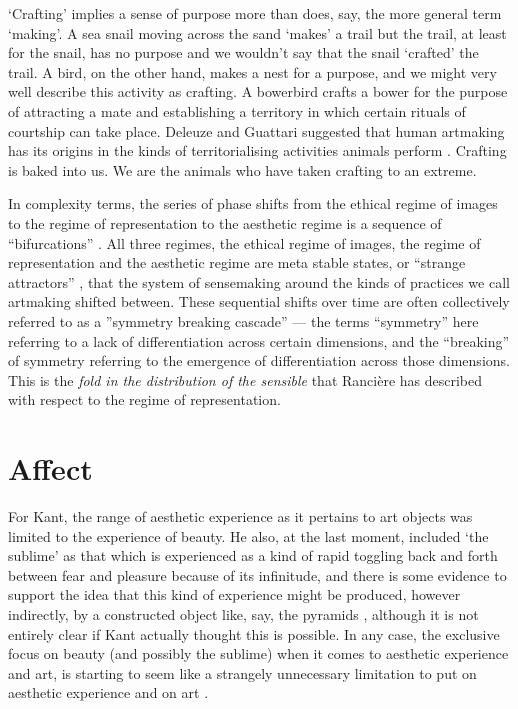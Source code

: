 \documentclass[letterpaper]{article}
\begin{document}
    ‘Crafting’ implies a sense of purpose more than does, say, the more general term ‘making’. A sea snail moving across the sand ‘makes’ a trail but the trail, at least for the snail, has no purpose and we wouldn't say that the snail ‘crafted’ the trail. A bird, on the other hand, makes a nest for a purpose, and we might very well describe this activity as crafting. A bowerbird crafts a bower for the purpose of attracting a mate and establishing a territory in which certain rituals of courtship can take place. Deleuze and Guattari suggested that human artmaking has its origins in the kinds of territorialising activities animals perform \citep[p.15]{GuattariChsmss1995}. Crafting is baked into us. We are the animals who have taken crafting to an extreme.
    
    In complexity terms, the series of phase shifts from the ethical regime of images to the regime of representation to the aesthetic regime is a sequence of “bifurcations” \citep{LandauThryOfPhstrnstns1936}. All three regimes, the ethical regime of images, the regime of representation and the aesthetic regime are meta stable states, or “strange attractors” \citep{RuelleTakensOnThNtrOfTrblnc1971}, that the system of sensemaking around the kinds of practices we call artmaking shifted between. These sequential shifts over time are often collectively referred to as a ”symmetry breaking cascade” — the terms “symmetry” here referring to a lack of differentiation across certain dimensions, and the “breaking” of symmetry referring to the emergence of differentiation across those dimensions. This is the \emph{fold in the distribution of the sensible} that Rancière has described with respect to the regime of representation.

\section{Affect}

    For Kant, the range of aesthetic experience as it pertains to art objects was limited to the experience of beauty.  He also, at the last moment, included ‘the sublime’ \citep[p.15]{ZepkeSblmArt2017} as that which is experienced as a kind of rapid toggling back and forth between fear and pleasure \citep[p.88]{KantCrtqOfJdgmnt} because of its infinitude, and there is some evidence to support the idea that this kind of experience might be produced, however indirectly, by a constructed object like, say, the pyramids \citep[p.82]{KantCrtqOfJdgmnt}, although it is not entirely clear if Kant actually thought this is possible. In any case, the exclusive focus on beauty (and possibly the sublime) when it comes to aesthetic experience and art, is starting to seem like a strangely unnecessary limitation to put on aesthetic experience and on art \citep[pp.121-122]{HighmoreBttrAftrTst2010}. 
        
\end{document}
